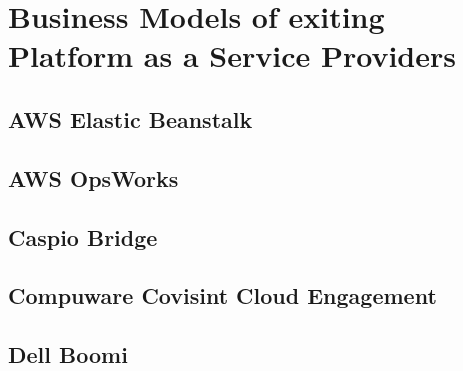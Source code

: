 \chapter{Business Models of exiting Platform as a Service Providers}\label{ch:app01}

\section{AWS Elastic Beanstalk}


\newpage
\section{AWS OpsWorks}


\section{Caspio Bridge}


%

\newpage
\section{Compuware Covisint Cloud Engagement}


\newpage
\section{Dell Boomi}


%

%

